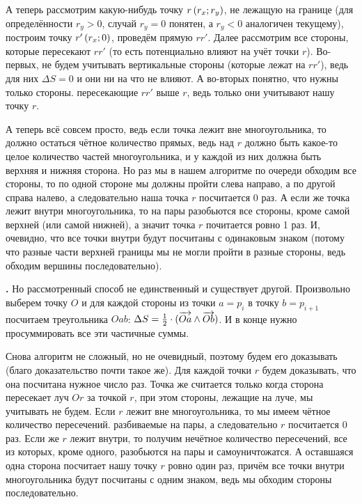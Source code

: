 А теперь рассмотрим какую-нибудь точку $r\left(r_x;r_y\right)$, не лежащую на границе (для определённости $r_y > 0$, случай $r_y = 0$ понятен, а $r_y < 0$ аналогичен текущему), построим точку $r'\left(r_x;0\right)$, проведём прямую $rr'$. Далее рассмотрим все стороны, которые пересекают $rr'$ (то есть потенциально влияют на учёт точки $r$). Во-первых, не будем учитывать вертикальные стороны (которые лежат на $rr'$), ведь для них $\Delta S = 0$ и они ни на что не влияют. А во-вторых понятно, что нужны только стороны. пересекающие $rr'$ выше $r$, ведь только они учитывают нашу точку $r$.

А теперь всё совсем просто, ведь если точка лежит вне многоугольника, то должно остаться чётное количество прямых, ведь над $r$ должно быть какое-то целое количество частей многоугольника, и у каждой из них должна быть верхняя и нижняя сторона. Но раз мы в нашем алгоритме по очереди обходим все стороны, то по одной стороне мы должны пройти слева направо, а по другой справа налево, а следовательно наша точка $r$ посчитается 0 раз. А если же точка лежит внутри многоугольника, то на пары разобьются все стороны, кроме самой верхней (или самой нижней), а значит точка $r$ почитается ровно 1 раз. И, очевидно, что все точки внутри будут посчитаны с одинаковым знаком (потому что разные части верхней границы мы не могли пройти в разные стороны, ведь обходим вершины последовательно).

\textbf{.} Но рассмотренный способ не единственный и существует другой. Произвольно выберем точку $O$ и для каждой стороны из точки $a = p_i$ в точку $b = p_{i + 1}$ посчитаем  треугольника $Oab$: $\Delta S = \frac{1}{2} \cdot (\overrightarrow{Oa} \wedge \overrightarrow{Ob})$. И в конце нужно просуммировать все эти частичные суммы.

Снова алгоритм не сложный, но не очевидный, поэтому будем его доказывать (благо доказательство почти такое же). Для каждой точки $r$ будем доказывать, что она посчитана нужное число раз. Точка же считается только когда сторона пересекает луч $Or$ за точкой $r$, при этом стороны, лежащие на луче, мы учитывать не будем. Если $r$ лежит вне многоугольника, то мы имеем чётное количество пересечений. разбиваемые на пары, а следовательно $r$ посчитается 0 раз. Если же $r$ лежит внутри, то получим нечётное количество пересечений, все из которых, кроме одного, разобьются на пары и самоуничтожатся. А оставшаяся одна сторона посчитает нашу точку $r$ ровно один раз, причём все точки внутри многоугольника будут посчитаны с одним знаком, ведь мы обходим стороны последовательно.

